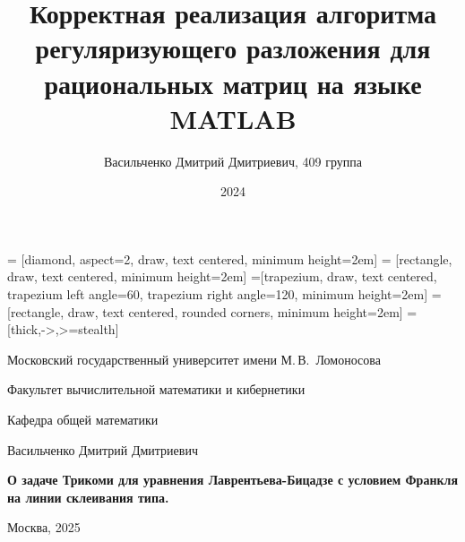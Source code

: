 \documentclass[10pt,pdf,hyperref={unicode}]{beamer}
\institute{МГУ им. М.В.Ломоносова}
\title[]{Корректная реализация алгоритма регуляризующего разложения для рациональных матриц на языке MATLAB}
\author[Васильченко  Д.Д.]{Васильченко Дмитрий Дмитриевич, 409 группа}
\date{2024}
\begin{document}
 = [diamond, aspect=2, draw, text centered, minimum height=2em]
 = [rectangle, draw, text centered, minimum height=2em]
=[trapezium, draw, text centered, trapezium left angle=60, trapezium right angle=120, minimum height=2em]
 = [rectangle, draw, text centered, rounded corners, minimum height=2em]
 = [thick,->,>=stealth]
\begin{frame}
\begin{center}%
Московский государственный университет имени М.\,В.~Ломоносова
    
    Факультет вычислительной математики и кибернетики
    
    Кафедра общей математики
  \end{center}%
  \vfill%
  \begin{center}%
    \large%
    Васильченко Дмитрий Дмитриевич
    
    \vspace{.5cm}
    
    \Large
    \textbf{О задаче Трикоми для уравнения Лаврентьева-Бицадзе с условием Франкля на линии склеивания типа.}
  \end{center}%
  \vfill
  \vfill%
  \vfill%
  \vfill%
  \vfill%
  \begin{center}%
    Москва, 2025%
  \end{center}%
\end{frame}
\end{document}
